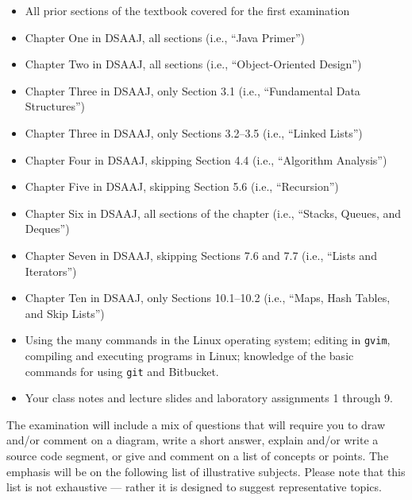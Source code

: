 \begin{itemize}

  \itemsep 0in

  \item All prior sections of the textbook covered for the first examination

  \item Chapter One in DSAAJ, all sections (i.e., ``Java Primer'')

  \item Chapter Two in DSAAJ, all sections (i.e., ``Object-Oriented Design'')

  \item Chapter Three in DSAAJ, only Section 3.1 (i.e., ``Fundamental Data Structures'')

  \item Chapter Three in DSAAJ, only Sections 3.2--3.5  (i.e., ``Linked Lists'')

  \item Chapter Four in DSAAJ, skipping Section 4.4 (i.e., ``Algorithm Analysis'')

  \item Chapter Five in DSAAJ, skipping Section 5.6 (i.e., ``Recursion'')

  \item Chapter Six in DSAAJ, all sections of the chapter (i.e., ``Stacks, Queues, and Deques'')

  \item Chapter Seven in DSAAJ, skipping Sections 7.6 and 7.7 (i.e., ``Lists and Iterators'')

  \item Chapter Ten in DSAAJ, only Sections 10.1--10.2 (i.e., ``Maps, Hash Tables, and Skip Lists'')

  \item Using the many commands in the Linux operating system; editing in {\tt gvim}, compiling and executing
    programs in Linux; knowledge of the basic commands for using {\tt git} and Bitbucket.

  \item Your class notes and lecture slides and laboratory assignments 1 through 9.

\end{itemize}

\noindent The examination will include a mix of questions that will require you to draw and/or comment on a diagram,
write a short answer, explain and/or write a source code segment, or give and comment on a list of concepts or points.
The emphasis will be on the following list of illustrative subjects. Please note that this list is not exhaustive ---
rather it is designed to suggest representative topics.

